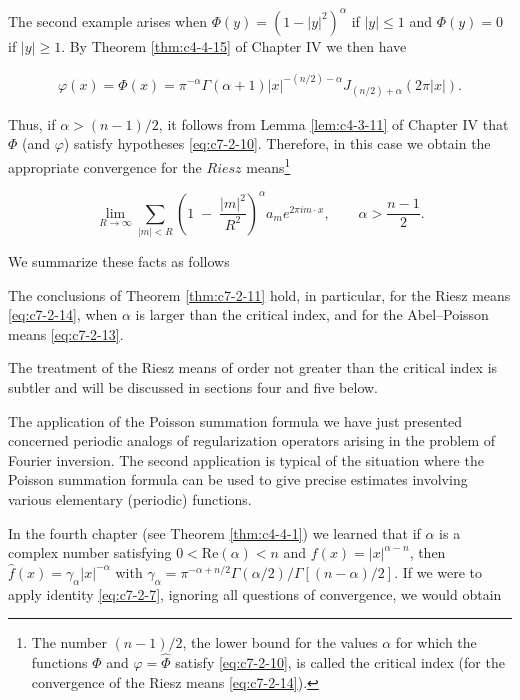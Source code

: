 The second example arises when $\Phi(y) = (1 - |y|^2)^{\alpha}$ if $|y| \leq 1$ and $\Phi(y) = 0$ if $|y| \geq 1$. By Theorem \ref{thm:c4-4-15} of Chapter IV we then have

\[
\begin{array}{r}{\varphi(x)=\Phi(x)=\pi^{-\alpha}\Gamma(\alpha+1)|x|^{-(n/2)-\alpha}J_{(n/2)+\alpha}(2\pi|x|).}\end{array}
\]

Thus, if $\alpha > (n - 1)/2$, it follows from Lemma \ref{lem:c4-3-11} of Chapter IV that $\Phi$ (and $\varphi$) satisfy hypotheses \eqref{eq:c7-2-10}. Therefore, in this case we obtain the appropriate convergence for the $Riesz$ means\footnote{The number $(n - 1)/2$, the lower bound for the values $\alpha$ for which the functions $\Phi$ and $\varphi = \hat{\Phi}$ satisfy \eqref{eq:c7-2-10}, is called the critical index (for the convergence of the Riesz means \eqref{eq:c7-2-14}).}

\begin{equation}\label{eq:c7-2-14}
\lim_{R\to\infty}\sum_{|m|<R}\left(1\;-\;\frac{|m|^{2}}{R^{2}}\right)^{\alpha}a_{m}e^{2\pi i m\cdot x},\qquad\alpha>\frac{n-1}{2}.
\end{equation}

We summarize these facts as follows

\begin{corollary}
\label{cor:c7-2-15}
The conclusions of Theorem \ref{thm:c7-2-11} hold, in particular, for the Riesz means \eqref{eq:c7-2-14}, when $\alpha$ is larger than the critical index, and for the Abel--Poisson means \eqref{eq:c7-2-13}.
\end{corollary}

The treatment of the Riesz means of order not greater than the critical index is subtler and will be discussed in sections four and five below.

The application of the Poisson summation formula we have just presented concerned periodic analogs of regularization operators arising in the problem of Fourier inversion. The second application is typical of the situation where the Poisson summation formula can be used to give precise estimates involving various elementary (periodic) functions.

In the fourth chapter (see Theorem \ref{thm:c4-4-1}) we learned that if $\alpha$ is a complex number satisfying $0 < \text{Re}(\alpha) < n$ and $f(x) = |x|^{\alpha-n}$, then $\hat{f}(x) = \gamma_\alpha|x|^{-\alpha}$ with $\gamma_\alpha = \pi^{-\alpha+n/2}\Gamma(\alpha/2)/\Gamma[(n-\alpha)/2]$. If we were to apply identity \eqref{eq:c7-2-7}, ignoring all questions of convergence, we would obtain

